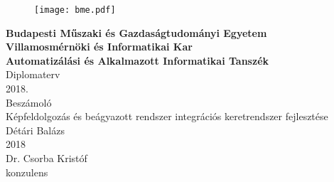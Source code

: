\begin{titlepage}

\begin{figure}
\centering
\texttt{[image: bme.pdf]}
\end{figure}

\centering
\textbf{Budapesti Műszaki és Gazdaságtudományi Egyetem}\\
\textbf{Villamosmérnöki és Informatikai Kar}\\
\textbf{Automatizálási és Alkalmazott Informatikai Tanszék}\\
\vspace{30mm}
\Huge
Diplomaterv\\
2018.\\
\Large
Beszámoló\\
\vspace{30mm}
\Large
Képfeldolgozás és beágyazott rendszer integrációs keretrendszer fejlesztése\\
\vspace{10mm}
\Large
Détári Balázs\\
\vspace{10mm}
2018\\
\vspace{25mm}
\Large
\hfill Dr. Csorba Kristóf\\
\normalsize
\hfill konzulens

\end{titlepage}